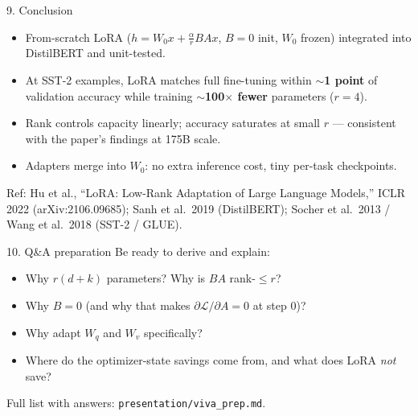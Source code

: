 \documentclass[aspectratio=169,10pt]{beamer}
\begin{document}
\begin{frame}{9. Conclusion}
\begin{itemize}
\item From-scratch LoRA ($h = W_0 x + \frac{\alpha}{r}BAx$, $B{=}0$ init,
      $W_0$ frozen) integrated into DistilBERT and unit-tested.
\item At \SubsetSize{} SST-2 examples, LoRA matches full fine-tuning within
      \textbf{$\sim$1 point} of validation accuracy while training
      \textbf{$\sim$100$\times$ fewer} parameters ($r{=}4$).
\item Rank controls capacity linearly; accuracy saturates at small $r$ ---
      consistent with the paper's findings at 175B scale.
\item Adapters merge into $W_0$: no extra inference cost, tiny per-task
      checkpoints.
\end{itemize}
\vspace{0.8em}
{\small Ref: Hu et al., ``LoRA: Low-Rank Adaptation of Large Language
Models,'' ICLR 2022 (arXiv:2106.09685); Sanh et al.~2019 (DistilBERT);
Socher et al.~2013 / Wang et al.~2018 (SST-2 / GLUE).}
\end{frame}

\begin{frame}{10. Q\&A preparation}
Be ready to derive and explain:
\begin{itemize}
\item Why $r(d{+}k)$ parameters? Why is $BA$ rank-$\le r$?
\item Why $B{=}0$ (and why that makes $\partial\mathcal{L}/\partial A = 0$ at
      step 0)?
\item Why adapt $W_q$ and $W_v$ specifically?
\item Where do the optimizer-state savings come from, and what does LoRA
      \emph{not} save?
\end{itemize}
Full list with answers: \texttt{presentation/viva\_prep.md}.
\end{frame}
\end{document}
